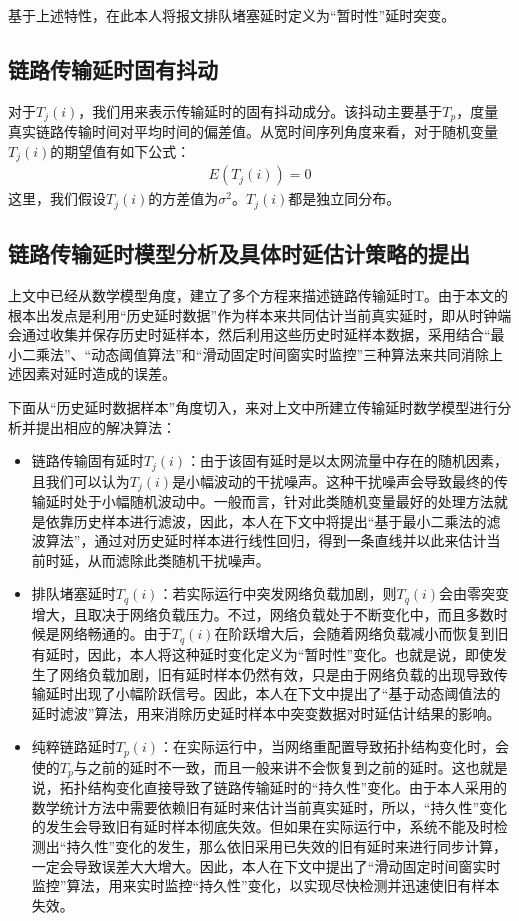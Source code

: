基于上述特性，在此本人将报文排队堵塞延时定义为“暂时性”延时突变。

\subsection{链路传输延时固有抖动}
对于$T_{j}(i)$，我们用来表示传输延时的固有抖动成分。该抖动主要基于$T_{p}$，度量真实链路传输时间对平均时间的偏差值。从宽时间序列角度来看，对于随机变量$T_{j}(i)$的期望值有如下公式：
\begin {align}
E(T_{j}(i)) = 0
\end {align}
这里，我们假设$T_{j}(i)$的方差值为$\sigma ^{2}$。$T_{j}(i)$都是独立同分布。

\subsection{链路传输延时模型分析及具体时延估计策略的提出}
上文中已经从数学模型角度，建立了多个方程来描述链路传输延时T。由于本文的根本出发点是利用“历史延时数据”作为样本来共同估计当前真实延时，即从时钟端会通过收集并保存历史时延样本，然后利用这些历史时延样本数据，采用结合“最小二乘法”、“动态阈值算法”和“滑动固定时间窗实时监控”三种算法来共同消除上述因素对延时造成的误差。

下面从“历史延时数据样本”角度切入，来对上文中所建立传输延时数学模型进行分析并提出相应的解决算法：
\begin{itemize}[noitemsep,topsep=0pt,parsep=0pt,partopsep=0pt]
	\item 链路传输固有延时$T_{j}(i)$：由于该固有延时是以太网流量中存在的随机因素，且我们可以认为$T_{j}(i)$是小幅波动的干扰噪声。这种干扰噪声会导致最终的传输延时处于小幅随机波动中。一般而言，针对此类随机变量最好的处理方法就是依靠历史样本进行滤波，因此，本人在下文中将提出“基于最小二乘法的滤波算法”，通过对历史延时样本进行线性回归，得到一条直线并以此来估计当前时延，从而滤除此类随机干扰噪声。
	\item 排队堵塞延时$T_{q}(i)$：若实际运行中突发网络负载加剧，则$T_{q}(i)$会由零突变增大，且取决于网络负载压力。不过，网络负载处于不断变化中，而且多数时候是网络畅通的。由于$T_{q}(i)$在阶跃增大后，会随着网络负载减小而恢复到旧有延时，因此，本人将这种延时变化定义为“暂时性”变化。也就是说，即使发生了网络负载加剧，旧有延时样本仍然有效，只是由于网络负载的出现导致传输延时出现了小幅阶跃信号。因此，本人在下文中提出了“基于动态阈值法的延时滤波”算法，用来消除历史延时样本中突变数据对时延估计结果的影响。
	\item 纯粹链路延时$T_{p}(i)$：在实际运行中，当网络重配置导致拓扑结构变化时，会使的$T_{p}$与之前的延时不一致，而且一般来讲不会恢复到之前的延时。这也就是说，拓扑结构变化直接导致了链路传输延时的“持久性”变化。由于本人采用的数学统计方法中需要依赖旧有延时来估计当前真实延时，所以，“持久性”变化的发生会导致旧有延时样本彻底失效。但如果在实际运行中，系统不能及时检测出“持久性”变化的发生，那么依旧采用已失效的旧有延时来进行同步计算，一定会导致误差大大增大。因此，本人在下文中提出了“滑动固定时间窗实时监控”算法，用来实时监控“持久性”变化，以实现尽快检测并迅速使旧有样本失效。
\end{itemize}

